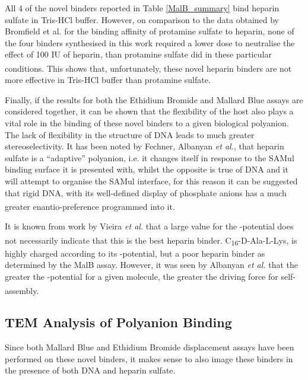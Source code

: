 All 4 of the novel binders reported in Table \ref{MalB_summary} bind heparin sulfate in Tris-HCl buffer. However, on comparison to the data obtained by Bromfield et al. for the binding affinity of protamine sulfate to heparin, none of the four binders synthesised in this work required a lower dose to neutralise the effect of 100 IU of heparin, than protamine sulfate did in these particular conditions.\textsuperscript{\cite{Bromfield2014NanoscaleMedia}} This shows that, unfortunately, these novel heparin binders are not more effective in Tris-HCl buffer than protamine sulfate. 

Finally, if the results for both the Ethidium Bromide and Mallard Blue assays are considered together, it can be shown that the flexibility of the host also plays a vital role in the binding of these novel binders to a given biological polyanion. The lack of flexibility in the structure of DNA leads to much greater stereoselectivity. It has been noted by Fechner, Albanyan \textit{et al.}, that heparin sulfate is a “adaptive” polyanion, i.e. it changes itself in response to the SAMul binding surface it is presented with, whilst the opposite is true of DNA and it will attempt to organise the SAMul interface, for this reason it can be suggested that rigid DNA, with its well-defined display of phosphate anions has a much greater enantio-preference programmed into it.\textsuperscript{\cite{Fechner2016ElectrostaticBinding}}

It is known from work by Vieira \textit{et al.} that a large value for the \textzeta-potential does not necessarily indicate that this is the best heparin binder.\textsuperscript{\cite{Vieira2017EmergenceHeparin}} C\textsubscript{16}-D-Ala-L-Lys, is highly charged according to its \textzeta-potential, but a poor heparin binder as determined by the MalB assay. However, it was seen by Albanyan \textit{et al.} that the greater the \textzeta-potential for a given molecule, the greater the driving force for self-assembly.\textsuperscript{\cite{Albanyan2017Self-AssembledLigands}}

\subsection{TEM Analysis of Polyanion Binding}
Since both Mallard Blue and Ethidium Bromide displacement assays have been performed on these novel binders, it makes sense to also image these binders in the presence of both DNA and heparin sulfate. 

